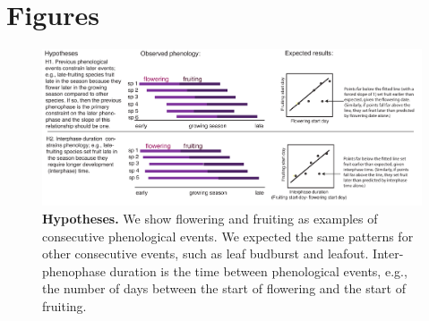 \documentclass{article}
\begin{document}
\section* {Figures}
\begin{figure}[p]
  \centering
  \includegraphics{../analyses/figures/hypotheses3.pdf} 
  \caption{\textbf{Hypotheses.} We show flowering and fruiting as examples of consecutive phenological events. We expected the same patterns for other consecutive events, such as leaf budburst and leafout. Inter-phenophase duration is the time between phenological events, e.g., the number of days between the start of flowering and the start of fruiting.} 
 \label{fig:hyp}
\end{figure}
 
\end{document}
